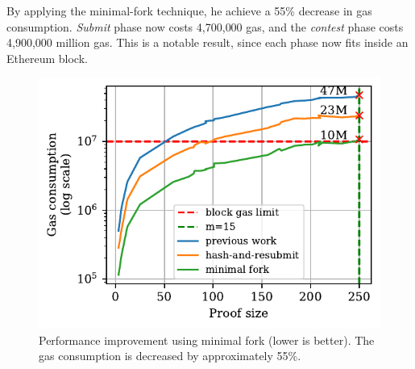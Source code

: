 By applying the minimal-fork technique, he achieve a 55\% decrease in gas
consumption. \emph{Submit} phase now costs {4{,}700{,}000} gas, and
the \emph{contest} phase costs {4{,}900{,}000} million gas. This is a notable
result, since each phase now fits inside an Ethereum block.



\begin{figure}[h]
    \begin{center}
        \includegraphics[width=1\columnwidth]{figures/minimal-fork.pdf}
    \end{center}
    \caption{Performance improvement using minimal fork (lower is better). The
        gas consumption is decreased by approximately 55\%.}
    \label{fig:minimal-fork}
\end{figure}
